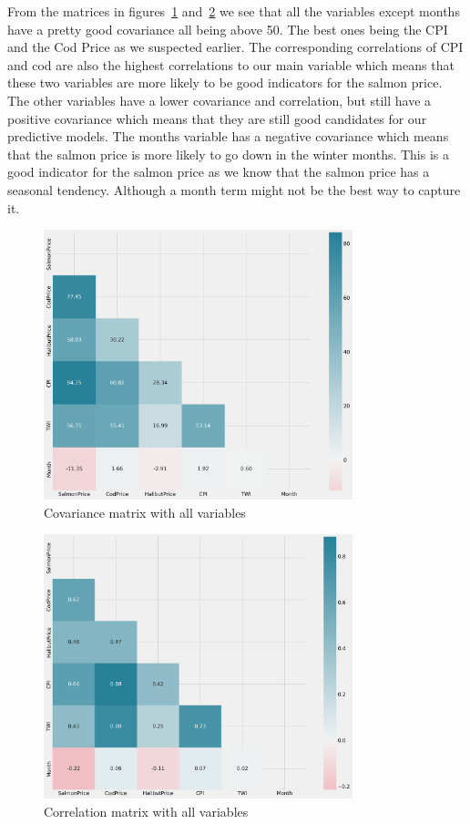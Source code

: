 From the matrices in figures~\ref{fig:CovMatrix} and~\ref{fig:CorrMatrix} we see that all the variables except months have a pretty good covariance all being above 50. The best ones being the CPI and the Cod Price as we suspected earlier. The corresponding correlations of CPI and cod are also the highest correlations to our main variable which means that these two variables are more likely to be good indicators for the salmon price. The other variables have a lower covariance and correlation, but still have a positive covariance which means that they are still good candidates for our predictive models. The months variable has a negative covariance which means that the salmon price is more likely to go down in the winter months. This is a good indicator for the salmon price as we know that the salmon price has a seasonal tendency. Although a month term might not be the best way to capture it.
\newpage
\begin{figure}[H]
    \centering
    \includegraphics[width=0.8\textwidth]{data/Figures/Descriptive/CovMatrix.png}
    \caption[Covariance matrix]{Covariance matrix with all variables}\label{fig:CovMatrix}
\end{figure}

\begin{figure}[H]
    \centering
    \includegraphics[width=0.8\textwidth]{data/Figures/Descriptive/CorrMatrix.png}
    \caption[Correlation matrix]{Correlation matrix with all variables}\label{fig:CorrMatrix}
\end{figure}


